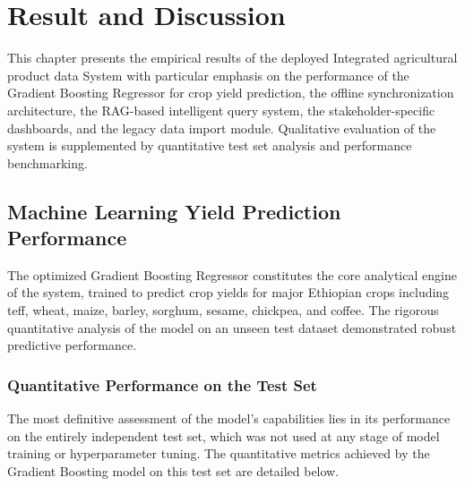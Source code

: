 
\chapter{Result and Discussion}

This chapter presents the empirical results of the deployed Integrated agricultural product data System with particular emphasis on the performance of the Gradient Boosting Regressor for crop yield prediction, the offline synchronization architecture, the RAG-based intelligent query system, the stakeholder-specific dashboards, and the legacy data import module. Qualitative evaluation of the system is supplemented by quantitative test set analysis and performance benchmarking.

\section{Machine Learning Yield Prediction Performance}

The optimized Gradient Boosting Regressor constitutes the core analytical engine of the system, trained to predict crop yields for major Ethiopian crops including teff, wheat, maize, barley, sorghum, sesame, chickpea, and coffee. The rigorous quantitative analysis of the model on an unseen test dataset demonstrated robust predictive performance.

\subsection{Quantitative Performance on the Test Set}

The most definitive assessment of the model's capabilities lies in its performance on the entirely independent test set, which was not used at any stage of model training or hyperparameter tuning. The quantitative metrics achieved by the Gradient Boosting model on this test set are detailed below.

